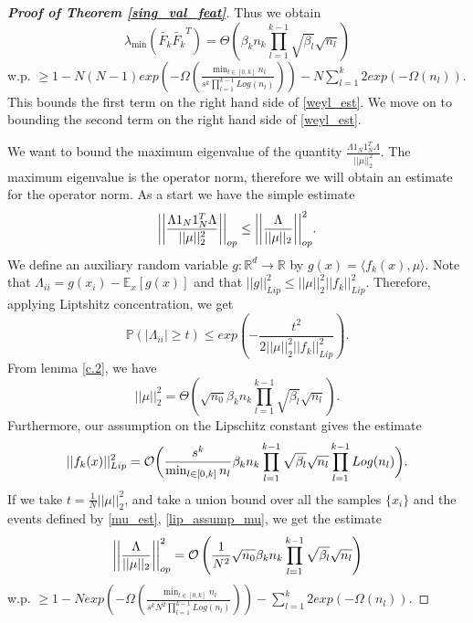\documentclass{article}
\theoremstyle{plain}
\theoremstyle{definition}
\theoremstyle{remark}
\newcommand\R{\mathbb{R}}
\begin{document}
\begin{proof}[\textbf{Proof of Theorem \ref{sing_val_feat}}]
Thus we obtain 
\begin{equation}\label{gersh_est2}
\lambda_{\min}(\widetilde{F_k}\widetilde{F_k}^T) = \Theta\left(
\beta_kn_k\prod_{l=1}^{k-1}\sqrt{\beta_l}\sqrt{n_l}
\right)
\end{equation}
w.p. $\geq 1 - N(N-1)exp\left(-
\Omega\left(
\frac{\min_{l \in [0,k]}n_l}{s^k\prod_{l=1}^{k-1}Log(n_l)}
\right)
\right) - N\sum_{l=1}^k2exp(-\Omega(n_l))$. This bounds the first term on the right hand side of \eqref{weyl_est}. We move on to bounding the second term on the right hand side of \eqref{weyl_est}.

We want to bound the maximum eigenvalue of the quantity 
$\frac{\Lambda 1_N1_N^T\Lambda}{\vert\vert \mu\vert\vert^2_2}$. The maximum eigenvalue is the operator norm, therefore we will obtain an estimate for the operator norm. As a start we have the simple estimate
\begin{equation*}
\bigg{\vert}\bigg{\vert}
\frac{\Lambda 1_N1_N^T\Lambda}{\vert\vert \mu\vert\vert^2_2}
\bigg{\vert}\bigg{\vert}_{op}
\leq 
\bigg{\vert}\bigg{\vert}
\frac{\Lambda}{\vert\vert \mu\vert\vert_2}
\bigg{\vert}\bigg{\vert}_{op}^2.
\end{equation*}
We define an auxiliary random variable $g : \R^d \rightarrow \R$ by 
$g(x) = \langle f_k(x), \mu\rangle$. Note that 
$\Lambda_{ii} = g(x_i) - \mathbb{E}_x[g(x)]$ and that 
$\vert\vert g\vert\vert_{Lip}^2 \leq \vert\vert\mu\vert\vert_2^2
\vert\vert f_k\vert\vert_{Lip}^2$. Therefore, applying Liptshitz concentration, we get 
\begin{equation*}
\mathbb{P}\left(\vert \Lambda_{ii}\vert \geq t\right) \leq 
exp\left(
- \frac{t^2}{2\vert\vert\mu\vert\vert_2^2\vert\vert f_k\vert\vert^2_{Lip}}
\right).
\end{equation*}
From lemma \ref{c.2}, we have 
\begin{equation}\label{mu_est}
	\vert\vert\mu\vert\vert_2^2 = \Theta\left(
	\sqrt{n_0}\beta_kn_k\prod_{l=1}^{k-1}\sqrt{\beta_l}\sqrt{n_l}
	\right).
\end{equation}
Furthermore, our assumption on the Lipschitz constant gives the estimate
\begin{equation}\label{lip_assump_mu}
	\vert\vert f_k(x)\vert\vert^2_{Lip} = 
	\mathcal{O}\bigg{(}
	\frac{s^k}{\min_{l \in [0,k]}n_l}\beta_kn_k\prod_{l=1}^{k-1}
	\sqrt{\beta_l}\sqrt{n_l}\prod_{l=1}^{k-1}Log(n_l)
	\bigg{)}.
\end{equation}
If we take $t = \frac{1}{N}\vert\vert\mu\vert\vert_2^2$, and take a union bound over all the samples $\{x_i\}$ and the events defined by \eqref{mu_est}, 
\eqref{lip_assump_mu}, we get the estimate
\begin{equation}
\bigg{\vert}\bigg{\vert}
\frac{\Lambda}{\vert\vert \mu\vert\vert_2}
\bigg{\vert}\bigg{\vert}_{op}^2 = \mathcal{O}\left(
\frac{1}{N^2}\sqrt{n_0}\beta_kn_k\prod_{l=1}^{k-1}\sqrt{\beta_l}\sqrt{n_l}
\right)
\end{equation}
w.p. 
$\geq 1 - Nexp\left(-
\Omega\left(
\frac{\min_{l \in [0,k]}n_l}{s^kN^2\prod_{l=1}^{k-1}Log(n_l)}
\right)
\right) - \sum_{l=1}^k2exp(-\Omega(n_l))$.


\end{proof}
\end{document}

